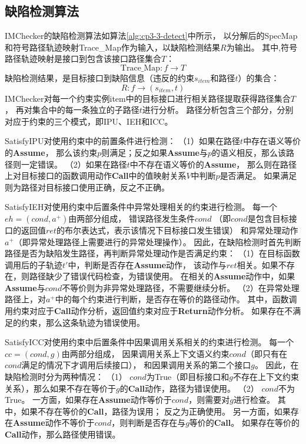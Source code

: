 

\subsection{缺陷检测算法}


IMChecker的缺陷检测算法如算法\ref{alg:cp3-3-detect}中所示，
以分解后的SpecMap和符号路径轨迹映射Trace\_Map作为输入，以缺陷检测结果$R$为输出。
其中,符号路径轨迹映射是接口到包含该接口路径集合$T$：
$$\text{Trace\_Map}: f \rightarrow T$$
缺陷检测结果，是目标接口到缺陷信息（违反的约束$s_{item}$和路径$t$）的集合：
$$R: f \rightarrow (s_{item}, t)$$
IMChecker对每一个约束实例item中的目标接口进行相关路径提取获得路径集合$T$，
再对集合中的每一条独立的子路径$t$进行分析。
路径分析包含三个部分，分别对应于约束的三个模式，即IPU、IEH和ICC。

SatisfyIPU对使用约束中的前置条件进行检测：
（1）如果在路径$t$中存在语义等价的\textbf{Assume}，
那么该约束$p$则满足；反之如果\textbf{Assume}与$p$的语义相反，那么该路径则一定错误。
（2）如果在路径$t$中不存在语义等价的\textbf{Assume}，
那么则在路径上对目标接口的函数调用动作\textbf{Call}中的值映射关系$V$中判断$p$是否满足。
如果满足则为路径对目标接口使用正确，反之不正确。

SatisfyIEH对使用约束中后置条件中异常处理相关的约束进行检测。
每一个$eh=(cond, a^+)$由两部分组成，
错误路径发生条件$cond$
（即$cond$是包含目标接口的返回值$ret$的布尔表达式，表示该情况下目标接口发生错误）
和异常处理动作$a^+$（即异常处理路径上需要进行的异常处理操作）。
因此，在缺陷检测时首先判断路径是否为缺陷发生路径，再判断异常处理动作是否满足约束：
（1）在目标函数调用后的子轨迹$t'$中，判断是否存在\textbf{Assume}动作，
该动作与$ret$相关。如果不存在，则路径缺少了错误代码检查，为错误使用。
在相关的\textbf{Assume}动作中，如果\textbf{Assume}与$cond$不等价则为非异常处理路径，不需要继续分析。
（2）在异常处理路径上，对$a^+$中的每个约束进行判断，是否存在等价的路径动作。
其中，函数调用约束对应于\textbf{Call}动作分析，返回值约束对应于\textbf{Return}动作分析。
如果存在不满足的约束，那么这条轨迹为错误使用。

SatisfyICC对使用约束中后置条件中因果调用关系相关的约束进行检测。
每一个$cc=(cond, g)$由两部分组成，
因果调用关系上下文语义约束$cond$（即只有在$cond$满足的情况下才调用后续接口），
和因果调用关系的第二个接口$g$。
因此，在缺陷检测时分为两种情况：
（1）
$cond$为True（即目标接口和$g$不存在上下文约束关系），那么如果不存在等价于$g$的\textbf{Call}动作，路径为错误使用。
（2）
$cond$不为True。
一方面，如果存在\textbf{Assume}动作等价于$cond$，则需要对$g$进行检查。
其中，如果不存在等价的\textbf{Call}，路径为误用；
反之为正确使用。
另一方面，如果存在\textbf{Assume}动作不等价于$cond$，则判断是否存在与$g$等价的\textbf{Call}。
如果存在等价的\textbf{Call}动作，那么路径使用错误。

